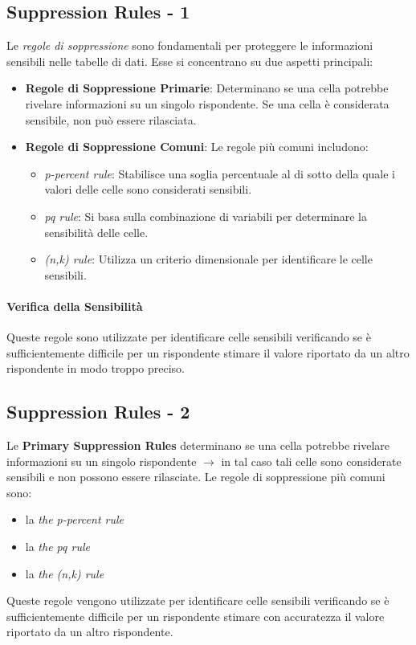 \documentclass{report}
\begin{document}
\subsection{Suppression Rules - 1}

Le \textit{regole di soppressione} sono fondamentali per proteggere le informazioni sensibili nelle tabelle di dati. Esse si concentrano su due aspetti principali:

\begin{itemize}
    \item \textbf{Regole di Soppressione Primarie}: Determinano se una cella potrebbe rivelare informazioni su un singolo rispondente. Se una cella è considerata sensibile, non può essere rilasciata.
    \item \textbf{Regole di Soppressione Comuni}: Le regole più comuni includono:
    \begin{itemize}
        \item \textit{p-percent rule}: Stabilisce una soglia percentuale al di sotto della quale i valori delle celle sono considerati sensibili.
        \item \textit{pq rule}: Si basa sulla combinazione di variabili per determinare la sensibilità delle celle.
        \item \textit{(n,k) rule}: Utilizza un criterio dimensionale per identificare le celle sensibili.
    \end{itemize}
\end{itemize}

\paragraph{Verifica della Sensibilità}
Queste regole sono utilizzate per identificare celle sensibili verificando se è sufficientemente difficile per un rispondente stimare il valore riportato da un altro rispondente in modo troppo preciso.

\subsection{Suppression Rules - 2}
Le \textbf{Primary Suppression Rules} determinano se una cella potrebbe rivelare informazioni su un singolo rispondente $\rightarrow$ in tal caso tali celle sono considerate sensibili e non possono essere rilasciate.
Le regole di soppressione più comuni sono:
    \begin{itemize}
        \item la \textit{the p-percent rule}
        \item la \textit{the pq rule}
        \item la \textit{the (n,k) rule}
    \end{itemize}
Queste regole vengono utilizzate per identificare celle sensibili verificando se è sufficientemente difficile per un rispondente stimare con accuratezza il valore riportato da un altro rispondente.
\end{document}
